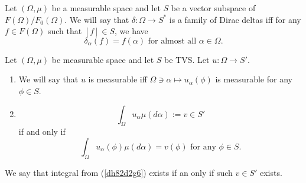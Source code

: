\documentclass[main.tex]{subfiles}
\begin{document}
\begin{definition}
\label{dirac-deltas-family}
Let $(\Omega, \mu)$ be a measurable space and let $S$ be a vector subspace of $F(\Omega)/F_0(\Omega)$. We will say that $\delta: \Omega\to S^*$ is a family of Dirac deltas iff for any $f\in F(\Omega)$ such that $[f]\in S$, we have
\begin{equation}
\delta_\alpha(f) = f(\alpha) \text{ for almost all } \alpha\in\Omega. 
\end{equation}
\end{definition}

\begin{definition}
\label{frechet-integral}
Let $(\Omega, \mu)$ be measurable space and let $S$ be TVS. Let $u:\Omega\to S'$.
\begin{enumerate}
\item
We will say that $u$ is measurable iff $\Omega\ni \alpha\mapsto u_\alpha(\phi)$ is measurable for any $\phi\in S$.
\item
\begin{equation}
\label{dh82d2g6}
\int_\Omega u_\alpha \mu(d\alpha) := v \in S'
\end{equation}
if and only if 
\begin{equation}
\int_\Omega u_\alpha(\phi) \mu(d\alpha) = v(\phi) \text{ for any } \phi\in S.
\end{equation}
\end{enumerate}
We say that integral from (\ref{dh82d2g6}) exists if an only if such $v\in S'$ exists.
\end{definition}
\end{document}
